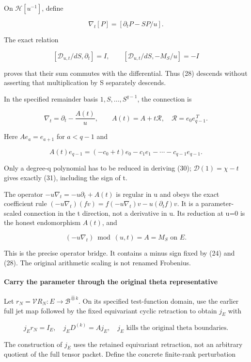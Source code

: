 On \(\mathcal H[u^{-1}]\), define

\[
\nabla_t[P]=[\partial_tP-S P/u].
\tag{28}
\]

The exact relation

\[
[\mathcal D_{u,t}/dS,\partial_t]=I,
\qquad
[\mathcal D_{u,t}/dS,-M_S/u]=-I
\tag{29}
\]

proves that their sum commutes with the differential. Thus (28) descends without asserting that multiplication by S separately descends.

In the specified remainder basis \(1,S,\ldots,S^{q-1}\), the connection is

\[
\boxed{\nabla_t=\partial_t-\frac{A(t)}u,
\qquad A(t)=A+t\mathcal R,\quad
\mathcal R=e_0e_{q-1}^{\,T}.}
\tag{30}
\]

Here \(A e_a=e_{a+1}\) for \(a<q-1\) and

\[
A(t)e_{q-1}=(-c_0+t)e_0-c_1e_1-\cdots-c_{q-1}e_{q-1}.
\tag{31}
\]

Only a degree-q polynomial has to be reduced in deriving (30); \(\mathcal D(1)=\chi-t\) gives exactly (31), including the sign of t.

The operator \(-u\nabla_t=-u\partial_t+A(t)\) is regular in u and obeys the exact coefficient rule \((-u\nabla_t)(fv)=f(-u\nabla_t)v-u(\partial_t f)v\). It is a parameter-scaled connection in the t direction, not a derivative in u. Its reduction at u=0 is the honest endomorphism \(A(t)\), and

\[
\boxed{(-u\nabla_t)\bmod(u,t)=A=M_S\text{ on }E.}
\tag{32}
\]

This is the precise operator bridge. It contains a minus sign fixed by (24) and (28). The original arithmetic scaling is not renamed Frobenius.

\paragraph{Carry the parameter through the original theta representative}\label{endpoint-exponential_original--carry-the-parameter-through-the-original-theta-representative}

Let \(r_N=\mathcal V R_N:E\to\mathscr B^{\widehat\otimes k}\). On its specified test-function domain, use the earlier full jet map followed by the fixed equivariant cyclic retraction to obtain \(j_E\) with

\[
j_Er_N=I_E,\quad j_ED^{(k)}=Aj_E,
\quad j_E\text{ kills the original theta boundaries}.
\tag{33}
\]

The construction of \(j_E\) uses the retained equivariant retraction, not an arbitrary quotient of the full tensor packet. Define the concrete finite-rank perturbation


